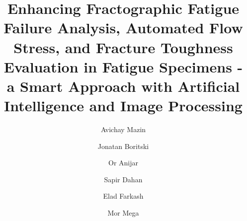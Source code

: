\documentclass[preprint,12pt]{elsarticle}
\begin{document}
\begin{frontmatter}



\title{Enhancing Fractographic Fatigue Failure Analysis, Automated Flow Stress, and Fracture Toughness Evaluation in Fatigue Specimens - a Smart Approach with Artificial Intelligence and Image Processing}

\author[Computer_a]{Avichay Mazin}
\author[Computer_a]{Jonatan Boritski}
\author[Computer_b]{Or Anijar}
\author[Computer_a]{Sapir Dahan}
\author[soreq]{Elad Farkash}
\author[fracture]{Mor Mega}




\end{frontmatter}
\end{document}
